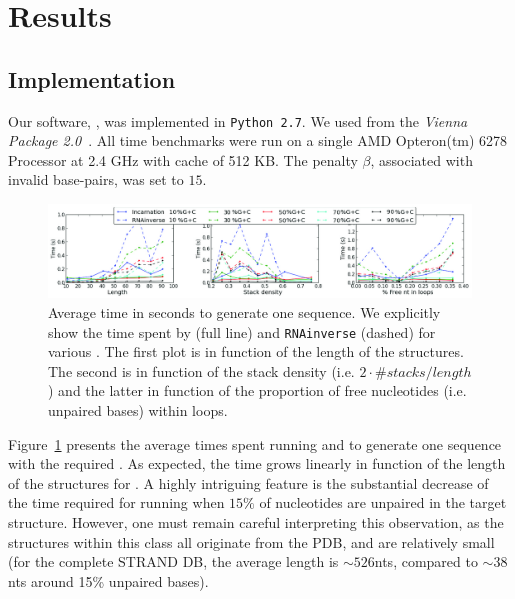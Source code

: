 \section{Results}
\label{sec:results}

\subsection{Implementation}
\label{sec:implementation}
Our software, \ourprog, was implemented in {\tt Python~2.7}. We used
\RNAinverse from the \textit{Vienna Package 2.0}~\citep{Hofacker:1994}.
All time benchmarks were run on a single AMD Opteron(tm) 6278 Processor  at 2.4 GHz with cache of 512 KB.
The penalty $\beta$, associated with invalid base-pairs, was set to $15$.

\begin{figure}[t!]
	\centering
 	\includegraphics[width=\textwidth]{Figures/time_rnastrand_clustered_rnainverse_100samples_fix}
	\caption{Average time in seconds to generate one sequence. We explicitly show 
	the time spent by \ourprog (full line) and \texttt{RNAinverse} (dashed) for various \GCContent. The first plot is in function
	of the length of the structures. The second is in function of the stack
	density (i.e. $2\cdot\#stacks/length$) and the latter in function of 
	the proportion of free nucleotides (i.e. unpaired bases) within loops.}
	\label{fig:time}	
\end{figure}

Figure~\ref{fig:time} presents the average times spent running \ourprog and \RNAinverse to generate one sequence
with the required \GCContent. As expected, the time grows linearly
in function of the length of the structures for \ourprog.  A highly intriguing feature is the substantial decrease of the time 
required for running \RNAinverse when $15\%$ of nucleotides are unpaired in the target structure.
However, one must remain careful interpreting this observation, as the structures within this class all originate from the PDB, and are relatively small (for the complete STRAND DB, the average length is $\sim526$nts, compared to $\sim38$nts around 15\% unpaired bases).



